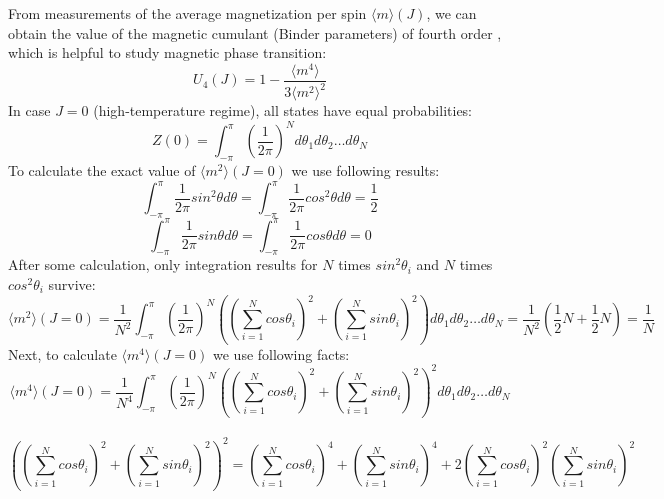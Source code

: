 From measurements of the average magnetization per spin $\langle m \rangle (J)$, we can obtain the value of the magnetic cumulant  (Binder parameters) of fourth order \cite{Binder2010}, which is helpful to study magnetic phase transition:
\begin{equation}
\label{binderqum}
U_4 (J) = 1 - \frac{ \langle m^4 \rangle}{3 \langle m^2 \rangle^2  }
\end{equation}
In case $J=0$ (high-temperature regime), all states have equal probabilities:
\begin{equation}
\label{paritionfunction_free_zero}
Z(0) =  %
\int_{-\pi}^{\pi} (\frac{1}{2 \pi})^N   d \theta_1 d \theta_2 \dots d\theta_N 
\end{equation}
To calculate the exact value of $\langle m^2 \rangle (J=0)$  we use following results: 
\begin{equation*} 
 \int_{-\pi}^{\pi}  \frac{1}{2 \pi} sin^2 \theta d \theta =\int_{-\pi}^{\pi}  \frac{1}{2 \pi} cos^2 \theta d \theta = \frac{1}{2} 
\end{equation*}
 \begin{equation*} \int_{-\pi}^{\pi}  \frac{1}{2 \pi} sin \theta d \theta  =\int_{-\pi}^{\pi}  \frac{1}{2 \pi} cos  \theta d \theta = 0 \end{equation*}
   After some calculation, only integration results for $N$ times $sin^2 \theta_i$ and $N$ times $cos^2 \theta_i$ survive:
\begin{equation} 
\label{m2j0}
  \langle m^2 \rangle (J=0) = \frac{1}{N^2}   \int_{-\pi}^{\pi}  (\frac{1}{2 \pi})^N \left(  
   ( \sum_{i=1}^{N} cos \theta_i )^2 +  (\sum_{i=1}^{N} sin \theta_i  )^2 \right)  d \theta_1 d \theta_2 \dots d\theta_N =
  \frac{1}{N^2}  (\frac{1}{2}N +\frac{1}{2}N)   = \frac{1}{N}
\end{equation}
Next, to calculate $\langle m^4 \rangle (J=0)$ we use following facts: 
\begin{equation*}
\langle m^4 \rangle (J=0) = \frac{1}{N^4}   \int_{-\pi}^{\pi}  (\frac{1}{2 \pi})^N \left(  
( \sum_{i=1}^{N} cos \theta_i )^2 +  (\sum_{i=1}^{N} sin \theta_i  )^2 \right)^2 d \theta_1 d \theta_2 \dots d\theta_N  
\end{equation*} \\ 
\begin{equation*}
 \left(  
( \sum_{i=1}^{N} cos \theta_i )^2 +  (\sum_{i=1}^{N} sin \theta_i  )^2 \right)^2 =  (\sum_{i=1}^{N} cos \theta_i )^4 + (\sum_{i=1}^{N} sin \theta_i )^4 + 2 ( \sum_{i=1}^{N} cos \theta_i )^2( \sum_{i=1}^{N} sin \theta_i )^2 
\end{equation*} \\

